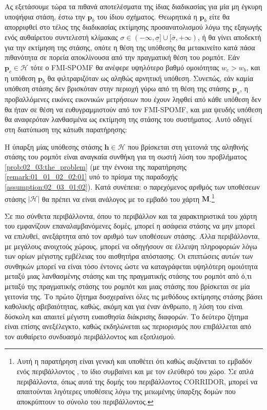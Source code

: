 Ας εξετάσουμε τώρα τα πιθανά αποτελέσματα της ίδιας διαδικασίας για μία μη
έγκυρη υποψήφια στάση, έστω την $\bm{p}_b$ του ίδιου σχήματος. Θεωρητικά η
$\bm{p}_b$ είτε θα απορριφθεί στο τέλος της διαδικασίας εκτίμησης
προσανατολισμού λόγω της εξαγωγής ενός αυθαίρετου συντελεστή κλίμακας $\sigma
\in (-\infty, \underline{\sigma}] \cup [\overline{\sigma}, +\infty)$, ή θα
γίνει αποδεκτή για την εκτίμηση της στάσης, οπότε η θέση της υπόθεσης θα
μετακινείτο κατά πάσα πιθανότητα σε πορεία αποκλίνουσα από την πραγματική θέση
του ρομπότ. Εάν $\bm{p}_c \in \mathcal{H}$ τότε ο FMI-SPOMF θα ανέφερε
υψηλότερο βαθμό ομοιότητας $w_c > w_b$, και η υπόθεση $\bm{p}_b$ θα
φιλτραριζόταν ως αληθώς αρνητική υπόθεση. Συνεπώς, εάν καμία υπόθεση στάσης δεν
βρισκόταν στην περιοχή γύρω από τη θέση της στάσης $\bm{p}_a$, η προβαλλόμενες
εικόνες εικονικών μετρήσεων που έχουν ληφθεί από κάθε υπόθεση δεν θα ήταν σε
θέση να ευθυγραμμιστούν από τον FMI-SPOMF, και μια ψευδής υπόθεση θα αναφερόταν
λανθασμένα ως εκτίμηση της στάσης του συστήματος. Αυτό οδηγεί στη διατύπωση της
κάτωθι παρατήρησης:

\begin{remark}
  \label{rem:hypotheses_number}
  Η ύπαρξη μίας υπόθεσης στάσης $\bm{h} \in \mathcal{H}$ που βρίσκεται στη
  γειτονιά της αληθινής στάσης του ρομπότ είναι αναγκαία συνθήκη για τη σωστή
  λύση του προβλήματος \ref{prob:02_03:the_problem} (με την έννοια της
  παρατήρησης \ref{remark:01_01_02_02:01} υπό το πρίσμα της παραδοχής
  \ref{assumption:02_03_01:02}). Κατά συνέπεια: ο παρεχόμενος αριθμός των
  υποθέσεων στάσης $|\mathcal{H}|$ θα πρέπει να είναι ανάλογος με το εμβαδό
  του χάρτη $\bm{M}$.\footnote{Αυτή η παρατήρηση είναι γενική και υποθέτει ότι καθώς
  αυξάνεται το εμβαδόν ενός περιβάλλοντος , το ίδιο συμβαίνει και με τον ελεύθερό
  του χώρο. Σε απλά περιβάλλοντα, όπως αυτά της δομής του περιβάλλοντος
  CORRIDOR, μπορεί να απαιτούνται λιγότερες υποθέσεις λόγω της μειωμένης
  ύπαρξης δομών που αποκρύπτουν το σύνολο του περιβάλλοντος.}
\end{remark}

Σε πιο σύνθετα περιβάλλοντα, όπου το περιβάλλον και τα χαρακτηριστικά του χάρτη
του εμφανίζουν επαναλαμβανόμενες δομές, μπορεί η ασάφεια στάσης να μην μπορεί
να επιλυθεί, ανεξάρτητα από τον αριθμό των υποθέσεων στάσης. Άλλα περιβάλλοντα,
με μεγάλους ανοιχτούς χώρους, μπορεί να οδηγήσουν σε έλλειψη πληροφοριών λόγω
των ορίων μέγιστης εμβέλειας του αισθητήρα απόστασης. Οι επιπτώσεις αυτών των
συνθηκών μπορεί να είναι τόσο έντονες ώστε να καταγράφεται υψηλότερη ομοιότητα
μεταξύ μιας λανθασμένης στάσης και της πραγματικής στάσης του ρομπότ από ό,τι
μεταξύ της πραγματικής στάσης του ρομπότ και μιας στάσης που βρίσκεται σε μία
γειτονία της. Το πρώτο ζήτημα δυσχεραίνει όλες τις μεθόδους εκτίμησης στάσης
βάσει καθολικής αβεβαιότητας, καθώς, ακόμη και για έναν άνθρωπο, η λύση του
είναι δύσκολη και απαιτεί μέγιστη ευαισθησία διάκρισης διαφορών. Το δεύτερο
ζήτημα είναι επίσης ανεξέλεγκτο, καθώς εκδηλώνεται ως περιορισμός που
επιβάλλεται από τον αυθαίρετο συνδυασμό περιβάλλοντος και εξοπλισμού.
